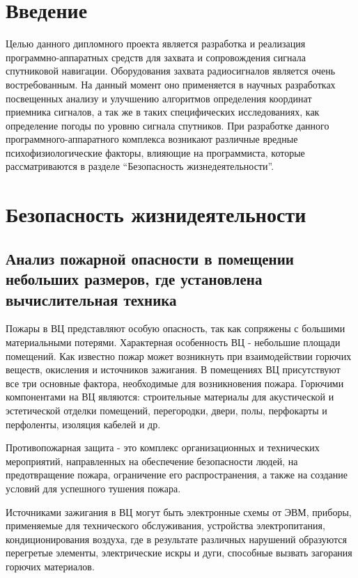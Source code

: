 \section{Введение}
Целью данного дипломного проекта является разработка и реализация программно-аппаратных средств
для захвата и сопровождения сигнала спутниковой навигации. Оборудования захвата радиосигналов является очень востребованным.
На данный момент оно применяется в научных разработках посвещенных анализу и улучшению алгоритмов определения координат 
приемника сигналов, а так же в таких специфических исследованиях, как определение погоды по уровню сигнала спутников.
При разработке данного программного-аппаратного комплекса возникают различные вредные психофизиологические факторы, влияющие
на программиста, которые рассматриваются в разделе “Безопасность жизнедеятельности”.  

\newpage

\setcounter{section}{3}
\section{Безопасность жизнидеятельности}

\subsection{Анализ пожарной опасности в помещении небольших размеров, где установлена вычислительная техника}

Пожары в ВЦ представляют особую опасность, так как сопряжены с большими материальными потерями.
Характерная особенность ВЦ - небольшие площади помещений. Как известно пожар может возникнуть при взаимодействии
горючих веществ, окисления и источников зажигания. В помещениях ВЦ присутствуют все три основные фактора,
необходимые для возникновения пожара. Горючими компонентами на ВЦ являются: строительные материалы для
акустической и эстетической отделки помещений, перегородки, двери, полы, перфокарты и перфоленты, изоляция кабелей и др.

Противопожарная защита - это комплекс организационных и технических мероприятий, направленных на обеспечение безопасности людей,
на предотвращение пожара, ограничение его распространения, а также на создание условий для успешного тушения пожара.

Источниками зажигания в ВЦ могут быть электронные схемы от ЭВМ, приборы, применяемые для технического обслуживания,
устройства электропитания, кондиционирования воздуха, где в результате различных нарушений образуются перегретые элементы,
электрические искры и дуги, способные вызвать загорания горючих материалов.

